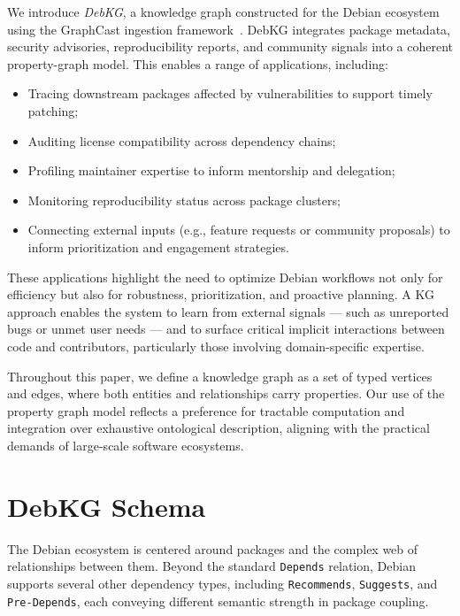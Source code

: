 \documentclass[10pt,oneside,a4paper, twocolumn]{article}
\begin{document}
    We introduce \emph{DebKG}, a knowledge graph constructed for the Debian ecosystem using the GraphCast ingestion framework~\cite{graphcast}.
    DebKG integrates package metadata, security advisories, reproducibility reports, and community signals into a coherent property-graph model.
    This enables a range of applications, including:

    \begin{itemize}
        \item Tracing downstream packages affected by vulnerabilities to support timely patching;
        \item Auditing license compatibility across dependency chains;
        \item Profiling maintainer expertise to inform mentorship and delegation;
        \item Monitoring reproducibility status across package clusters;
        \item Connecting external inputs (e.g., feature requests or community proposals) to inform prioritization and engagement strategies.
    \end{itemize}

    These applications highlight the need to optimize Debian workflows not only for efficiency but also for robustness, prioritization, and proactive planning.
    A KG approach enables the system to learn from external signals — such as unreported bugs or unmet user needs — and to surface critical implicit interactions between code and contributors, particularly those involving domain-specific expertise.

    Throughout this paper, we define a knowledge graph as a set of typed vertices and edges, where both entities and relationships carry properties.
    Our use of the property graph model reflects a preference for tractable computation and integration over exhaustive ontological description, aligning with the practical demands of large-scale software ecosystems.


    \section{DebKG Schema}

    The Debian ecosystem is centered around packages and the complex web of relationships between them.
    Beyond the standard \texttt{Depends} relation, Debian supports several other dependency types, including \texttt{Recommends}, \texttt{Suggests}, and \texttt{Pre-Depends}, each conveying different semantic strength in package coupling.
\end{document}

